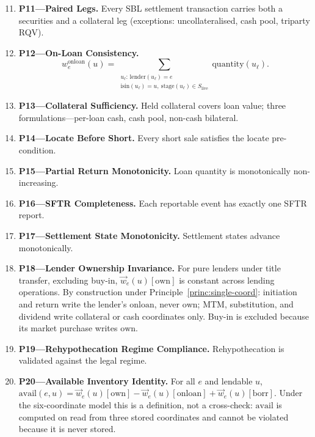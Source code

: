 \begin{invariant}[P11--P20]
\label{inv:P11}\label{inv:P20}
\begin{enumerate}\setcounter{enumi}{10}
\item \textbf{P11---Paired Legs.} Every SBL settlement transaction carries both a securities and a collateral leg (exceptions: uncollateralised, cash pool, triparty RQV).
\item \textbf{P12---On-Loan Consistency.}
\[ w^{\mathrm{onloan}}_e(u) = \sum_{\substack{u_\ell:\,\mathrm{lender}(u_\ell)=e\\ \mathrm{isin}(u_\ell)=u,\ \mathrm{stage}(u_\ell)\in S_{\mathrm{live}}}} \mathrm{quantity}(u_\ell). \]
\item \textbf{P13---Collateral Sufficiency.} Held collateral covers loan value; three formulations---per-loan cash, cash pool, non-cash bilateral.
\item \textbf{P14---Locate Before Short.} Every short sale satisfies the locate pre-condition.
\item \textbf{P15---Partial Return Monotonicity.} Loan quantity is monotonically non-increasing.
\item \textbf{P16---SFTR Completeness.} Each reportable event has exactly one SFTR report.
\item \textbf{P17---Settlement State Monotonicity.} Settlement states advance monotonically.
\item \textbf{P18---Lender Ownership Invariance.} For pure lenders under title transfer, excluding buy-in, $\vec{w}_e(u)[\mathrm{own}]$ is constant across lending operations. By construction under Principle~\ref{princ:single-coord}: initiation and return write the lender's $\mathrm{onloan}$, never $\mathrm{own}$; MTM, substitution, and dividend write collateral or cash coordinates only. Buy-in is excluded because its market purchase writes $\mathrm{own}$.
\item \textbf{P19---Rehypothecation Regime Compliance.} Rehypothecation is validated against the legal regime.
\item \textbf{P20---Available Inventory Identity.} For all $e$ and lendable $u$, $\mathrm{avail}(e,u) = \vec{w}_e(u)[\mathrm{own}] - \vec{w}_e(u)[\mathrm{onloan}] + \vec{w}_e(u)[\mathrm{borr}]$. Under the six-coordinate model this is a definition, not a cross-check: $\mathrm{avail}$ is computed on read from three stored coordinates and cannot be violated because it is never stored.
\end{enumerate}
\end{invariant}

\clearpage
